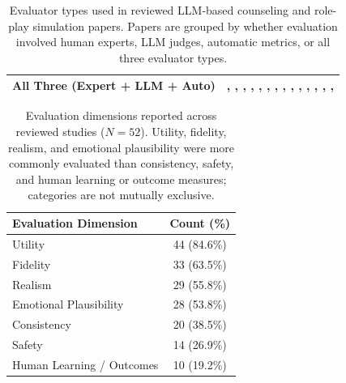 \begin{table}[tbp]
\begin{tabular}{p{5cm}p{10cm}}
\midrule
All Three (Expert + LLM + Auto) & \citealp{Aghakhani2025From}, \citealp{Feng2025Reframe}, \citealp{Kim2025Can}, \citealp{Li2024Understanding}, \citealp{Louie2026Can}, \citealp{Nguyen2025Do}, \citealp{Samuel2025PersonaGym}, \citealp{Schmidgall2025AgentClinic}, \citealp{Wang2024PATIENT}, \citealp{Wang2025CARE-Bench}, \citealp{Wang2025Psychological}, \citealp{Xie2025PsyDT}, \citealp{Xu2025MultiAgentESC}, \citealp{Yang2025CAMI}, \citealp{Yang2025Consistent} \\
\bottomrule
\end{tabular}
\caption{Evaluator types used in reviewed LLM-based counseling and role-play simulation papers. Papers are grouped by whether evaluation involved human experts, LLM judges, automatic metrics, or all three evaluator types.}
\label{tab:evaluator-types-cite}
\end{table}


\begin{table}[tbp]
\centering
\small
\begin{tabular}{lc}
\toprule
\textbf{Evaluation Dimension} & \textbf{Count (\%)} \\
\midrule
Utility & 44 (84.6\%) \\
Fidelity & 33 (63.5\%) \\
Realism & 29 (55.8\%) \\
Emotional Plausibility & 28 (53.8\%) \\
Consistency & 20 (38.5\%) \\
Safety & 14 (26.9\%) \\
Human Learning / Outcomes & 10 (19.2\%) \\
\bottomrule
\end{tabular}
\caption{Evaluation dimensions reported across reviewed studies ($N=52$). Utility, fidelity, realism, and emotional plausibility were more commonly evaluated than consistency, safety, and human learning or outcome measures; categories are not mutually exclusive.}
\label{tab:eval-dimensions}
\end{table}

